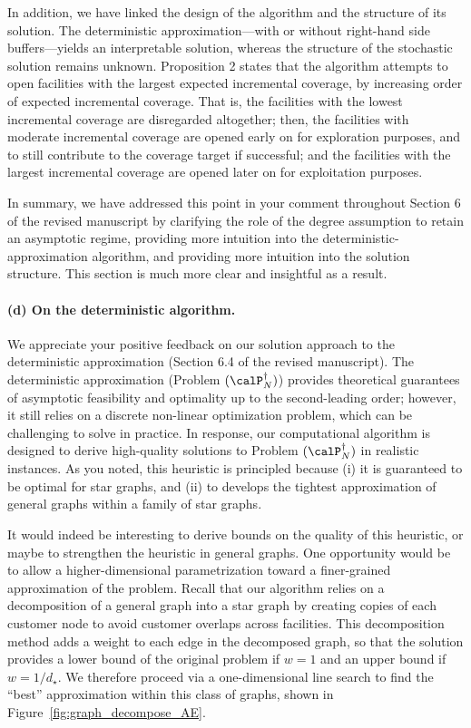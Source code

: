 \documentclass[11pt]{article}
\begin{document}
In addition, we have linked the design of the algorithm and the structure of its solution. The deterministic approximation---with or without right-hand side buffers---yields an interpretable solution, whereas the structure of the stochastic solution remains unknown. Proposition 2 states that the algorithm attempts to open facilities with the largest expected incremental coverage, by increasing order of expected incremental coverage. That is, the facilities with the lowest incremental coverage are disregarded altogether; then, the facilities with moderate incremental coverage are opened early on for exploration purposes, and to still contribute to the coverage target if successful; and the facilities with the largest incremental coverage are opened later on for exploitation purposes.

In summary, we have addressed this point in your comment throughout Section 6 of the revised manuscript by clarifying the role of the degree assumption to retain an asymptotic regime, providing more intuition into the deterministic-approximation algorithm, and providing more intuition into the solution structure. This section is much more clear and insightful as a result.

\paragraph{(d) On the deterministic algorithm.}

We appreciate your positive feedback on our solution approach to the deterministic approximation (Section 6.4 of the revised manuscript). The deterministic approximation (Problem $(\calP_N^\dagger)$) provides theoretical guarantees of asymptotic feasibility and optimality up to the second-leading order; however, it still relies on a discrete non-linear optimization problem, which can be challenging to solve in practice. In response, our computational algorithm is designed to derive high-quality solutions to Problem $(\calP_N^\dagger)$ in realistic instances. As you noted, this heuristic is principled because (i) it is guaranteed to be optimal for star graphs, and (ii) to develops the tightest approximation of general graphs within a family of star graphs.

It would indeed be interesting to derive bounds on the quality of this heuristic, or maybe to strengthen the heuristic in general graphs. One opportunity would be to allow a higher-dimensional parametrization toward a finer-grained approximation of the problem. Recall that our algorithm relies on a decomposition of a general graph into a star graph by creating copies of each customer node to avoid customer overlaps across facilities. This decomposition method adds a weight to each edge in the decomposed graph, so that the solution provides a lower bound of the original problem if $w=1$ and an upper bound if $w=1/d_\star$. We therefore proceed via a one-dimensional line search to find the ``best'' approximation within this class of graphs, shown in Figure~\ref{fig:graph_decompose_AE}.
\end{document}
